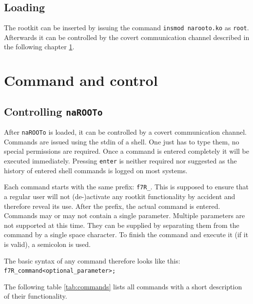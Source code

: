 \documentclass[10pt, letterpaper]{scrartcl}
\begin{document}
\subsection{Loading}
The rootkit can be inserted by issuing the command \texttt{insmod narooto.ko} as \texttt{root}.
Afterwards it can be controlled by the covert communication channel described in the following chapter \ref{sec:command_and_control}.

\section{Command and control}\label{sec:command_and_control}
\subsection{Controlling \texttt{naROOTo}}
After \texttt{naROOTo} is loaded, it can be controlled by a covert communication channel. 
Commands are issued using the stdin of a shell.
One just has to type them, no special permissions are required.
Once a command is entered completely it will be executed immediately. Pressing \texttt{enter} is neither required nor suggested as the history of entered shell commands is logged on most systems.

Each command starts with the same prefix: \texttt{f7R\_}.
This is supposed to ensure that a regular user will not (de-)activate any rootkit functionality by accident and therefore reveal its use.
After the prefix, the actual command is entered.
Commands may or may not contain a single parameter.
Multiple parameters are not supported at this time.
They can be supplied by separating them from the command by a single space character.
To finish the command and execute it (if it is valid), a semicolon is used.

The basic syntax of any command therefore looks like this: \texttt{f7R\_command\textvisiblespace <optional\_parameter>;} 

The following table \ref{tab:commands} lists all commands with a short description of their functionality.
\end{document}
